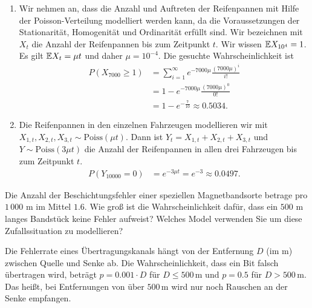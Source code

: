 \solution
\begin{enumerate}
    \item Wir nehmen an, dass die Anzahl und Auftreten der Reifenpannen mit
        Hilfe der Poisson-Verteilung modelliert werden kann, da die
        Voraussetzungen der Stationarität, Homogenität und Ordinarität erfüllt
        sind.  Wir bezeichnen mit $X_t$ die Anzahl der Reifenpannen bis zum
        Zeitpunkt $t$.  Wir wissen $\mathbb E X_{10^4} = 1$. Es gilt $\mathbb E X_{t} = \mu
        t$ und daher $\mu = 10^{-4}$. Die gesuchte Wahrscheinlichkeit ist
        \begin{align*}
            P(X_{7000} \geq 1) &= \sum_{i=1}^{\infty} e^{-7000 \mu} \frac{ \left( 7000 \mu \right)^{i} }{i!} \\
            &= 1 - e^{-7000 \mu} \frac{ (7000 \mu)^{0} }{0!} \\ 
            &= 1 - e^{-\frac{7}{10}} \approx 0.5034.
        \end{align*}

    \item Die Reifenpannen in den einzelnen Fahrzeugen modellieren wir mit
        $X_{1,t}, X_{2,t}, X_{3,t} \sim \text{Poiss}(\mu t)$. Dann ist
        $Y_t=X_{1,t}+X_{2,t}+X_{3,t}$ und $Y \sim \text{Poiss}(3\mu t)$ die
        Anzahl der Reifenpannen in allen drei Fahrzeugen bis zum Zeitpunkt $t$.
        \begin{align*}
            P(Y_{10000} = 0) &= e^{ - 3 \mu t } = e^{-3} \approx 0.0497.
        \end{align*}
\end{enumerate}


 Die Anzahl der Beschichtungsfehler einer
speziellen Magnetbandsorte betrage pro $1\, 000$ m im Mittel $1.6$. Wie groß
ist die Wahrscheinlichkeit dafür, dass ein $500$ m langes Bandstück keine
Fehler aufweist? Welches Model verwenden Sie um diese Zufallssituation zu
modellieren? 


 Die Fehlerrate eines Übertragungskanals hängt
von der Entfernung $D$ (im m) zwischen Quelle und Senke ab. Die
Wahrscheinlichkeit, dass ein Bit falsch übertragen wird, beträgt $p =
0.001\cdot{} D$ für $D\leq 500\,\text{m}$ und $p=0.5$ für $D>500\,\text{m}$.
Das heißt, bei Entfernungen von über $500\,\text{m}$ wird nur noch Rauschen an
der Senke empfangen.

